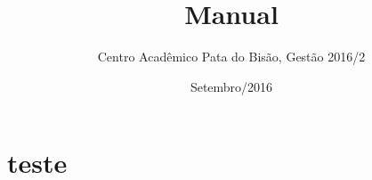 \documentclass[12pt]{article}
\title{Manual}
\author{Centro Acadêmico Pata do Bisão, Gestão 2016/2}
\date{Setembro/2016}
\begin{document}
\maketitle
\section{teste}
\end{document}
